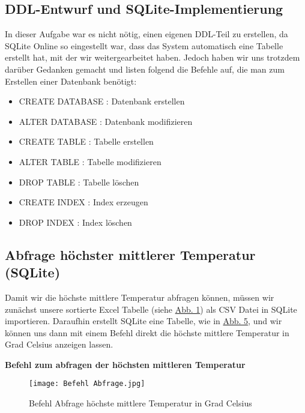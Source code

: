 \documentclass{article}
\begin{document}
\raggedright\subsection{DDL-Entwurf und SQLite-Implementierung}

In dieser Aufgabe war es nicht nötig, einen eigenen DDL-Teil zu erstellen, da SQLite Online so eingestellt war, dass das System automatisch eine Tabelle erstellt hat, mit der wir weitergearbeitet haben. Jedoch haben wir uns trotzdem darüber Gedanken gemacht und listen folgend die Befehle auf, die man zum Erstellen einer Datenbank benötigt:
\\ 

\begin{itemize}
    \item CREATE DATABASE : Datenbank erstellen
    \item ALTER DATABASE : Datenbank modifizieren
    \item CREATE TABLE : Tabelle erstellen
    \item ALTER TABLE : Tabelle modifizieren
    \item DROP TABLE : Tabelle löschen
    \item CREATE INDEX : Index erzeugen
    \item DROP INDEX : Index löschen
\end{itemize}

\subsection{Abfrage höchster mittlerer Temperatur (SQLite)}

Damit wir die höchste mittlere Temperatur abfragen können, müssen wir zunächst unsere sortierte Excel Tabelle (siehe \hyperref[fig: Tabelle sortiert ]{Abb. 1}) als CSV Datei in SQLite importieren. Daraufhin erstellt SQLite eine Tabelle, wie in \hyperref[fig: Tabelle zum Abfragen ]{Abb. 5}, und wir können uns dann mit einem Befehl direkt die höchste mittlere Temperatur in Grad Celsius anzeigen lassen.

\vspace{10pt}
\centering\textbf{Befehl zum abfragen der höchsten mittleren Temperatur}

\begin{figure}[H]
    \centering
    \texttt{[image: Befehl Abfrage.jpg]}
    \caption{Befehl Abfrage höchste mittlere Temperatur in Grad Celsius}
    \label{fig:enter-label}
\end{figure}
\end{document}
